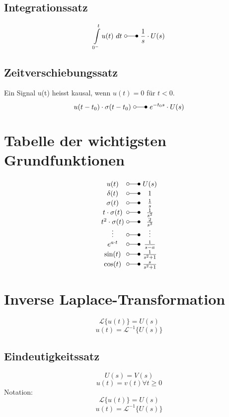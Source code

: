 \subsection{Integrationssatz}
\[ 
    \int\limits_{0^-}^{t} u(t) ~ dt ~ \laplace ~ \frac{1}{s} \cdot U(s) 
\]

\subsection{Zeitverschiebungssatz}
Ein Signal u(t) heisst kausal, wenn $u(t) = 0$ für $t < 0$.
\[ 
    u(t - t_0) \cdot \sigma(t - t_0) ~ \laplace ~ e^{-t_0s} \cdot U(s) 
\]

\section{Tabelle der wichtigsten Grundfunktionen}
\[ 
    \begin{array}{c@{ ~ \laplace ~ }c}
        u(t) 
            & U(s) \\
        \delta(t) 
            & 1 \\
        \sigma(t) 
            & \frac{1}{s} \\
        t \cdot \sigma(t) 
            & \frac{1}{s^2} \\
        t^2 \cdot \sigma(t) 
            & \frac{2}{s^3} \\
        \vdots 
            & \vdots \\
        e^{a \cdot t} 
            & \frac{1}{s - a} \\
        \sin(t) 
            & \frac{1}{s^2 + 1} \\
        \cos(t) 
            & \frac{s}{s^2 + 1} \\
    \end{array} 
\]

\section{Inverse Laplace-Transformation}
\[ 
    \mathcal{L} \lbrace u(t) \rbrace = U(s)
\]
\[ 
    u(t) = \mathcal{L}^{-1} \lbrace U(s) \rbrace
\]

\subsection{Eindeutigkeitssatz}
\[ 
    U(s) = V(s) 
\]
\[ 
    u(t) = v(t) \forall t \geq 0 
\]
Notation:
\[ 
    \mathcal{L} \{ u(t) \} = U(s) 
\]
\[ 
    u(t) = \mathcal{L}^{-1} \{ U(s) \} 
\]

